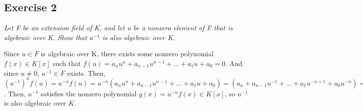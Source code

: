\subsection*{Exercise 2}
\textit{Let F be an extension field of K, and let u be a nonzero element of F that is algebraic over K. Show that $u^{-1}$ is also algebraic over K.}

\vspace{5 mm}
Since $u \in F$ is algebraic over K, there exists some nonzero polynomial $f(x) \in K[x]$ such that $f(u) = a_nu^n + a_{n-1}u^{n-1} + ... + a_1u + a_0 = 0$. And since $u \not= 0$, $u^{-1} \in F$ exists. Then, $(u^{-1})^nf(u) = u^{-n}f(u) = u^{-n}(a_nu^n + a_{n-1}u^{n-1} + ... + a_1u + a_0) = (a_n + a_{n-1}u^{-1} + ... + a_1u^{-n+1} + a_0u^{-n}) = 0$. Then, $u^{-1}$ satisfies the nonzero polynomial $g(x) = u^{-n}f(x) \in K[x]$, so $u^{-1}$ is also algebraic over $K$.
